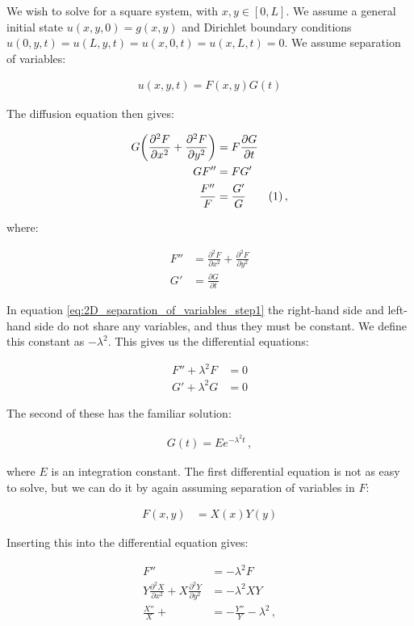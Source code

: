 \documentclass[reprint,english,notitlepage]{revtex4-1}  %
\newcommand\numberthis{\addtocounter{equation}{1}\tag{\theequation}}
\begin{document}
We wish to solve for a square system, with $x,y \in [0,L]$. We assume a general initial state $u(x,y,0) = g(x,y)$ and Dirichlet boundary conditions $u(0,y,t) = u(L,y,t) = u(x,0,t) = u(x,L,t) = 0$. We assume separation of variables:

\begin{align*}
u(x,y,t) = F(x,y) G(t)
\end{align*}

The diffusion equation then gives:

\begin{align*}
G\bigg( \frac{\partial^2 F}{\partial x^2} + \frac{\partial^2 F}{\partial y^2} \bigg) &= F\frac{\partial G}{\partial t} \\
GF'' &= FG'\\
\frac{F''}{F} &= \frac{G'}{G} \numberthis \label{eq:2D_separation_of_variables_step1} \, ,
\end{align*}

where:

\begin{align*}
F'' &= \frac{\partial^2 F}{\partial x^2} + \frac{\partial^2 F}{\partial y^2} \\
G' &= \frac{\partial G}{\partial t}
\end{align*}

In equation \eqref{eq:2D_separation_of_variables_step1} the right-hand side and left-hand side do not share any variables, and thus they must be constant. We define this constant as $-\lambda^2$. This gives us the differential equations:

\begin{align*}
F'' + \lambda^2 F &= 0 \\
G' + \lambda^2 G &= 0
\end{align*}

The second of these has the familiar solution:

\begin{align*}
G(t) = Ee^{-\lambda^2 t} \, ,
\end{align*}

where $E$ is an integration constant. The first differential equation is not as easy to solve, but we can do it by again assuming separation of variables in $F$:

\begin{align*}
F(x,y) &= X(x) Y(y)
\end{align*}

Inserting this into the differential equation gives:

\begin{align*}
F'' &= -\lambda^2 F \\
Y \frac{\partial^2 X}{\partial x^2} + X \frac{\partial^2 Y}{\partial y^2} &= -\lambda^2 XY \\
\frac{X''}{X} +  &= - \frac{Y''}{Y} - \lambda^2 \, ,
\end{align*}
\end{document}
